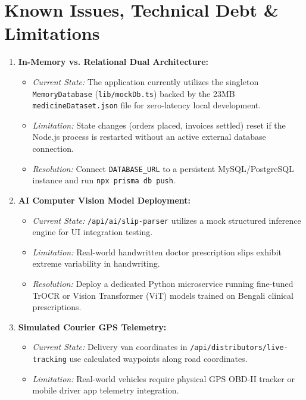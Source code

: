 \documentclass[10pt,a4paper]{article}
\begin{document}
\section{Known Issues, Technical Debt \& Limitations}
\begin{enumerate}[leftmargin=*]
    \item \textbf{In-Memory vs. Relational Dual Architecture:}
    \begin{itemize}
        \item \textit{Current State:} The application currently utilizes the singleton \texttt{MemoryDatabase} (\texttt{lib/mockDb.ts}) backed by the 23MB \texttt{medicineDataset.json} file for zero-latency local development.
        \item \textit{Limitation:} State changes (orders placed, invoices settled) reset if the Node.js process is restarted without an active external database connection.
        \item \textit{Resolution:} Connect \texttt{DATABASE\_URL} to a persistent MySQL/PostgreSQL instance and run \texttt{npx prisma db push}.
    \end{itemize}
    \item \textbf{AI Computer Vision Model Deployment:}
    \begin{itemize}
        \item \textit{Current State:} \texttt{/api/ai/slip-parser} utilizes a mock structured inference engine for UI integration testing.
        \item \textit{Limitation:} Real-world handwritten doctor prescription slips exhibit extreme variability in handwriting.
        \item \textit{Resolution:} Deploy a dedicated Python microservice running fine-tuned TrOCR or Vision Transformer (ViT) models trained on Bengali clinical prescriptions.
    \end{itemize}
    \item \textbf{Simulated Courier GPS Telemetry:}
    \begin{itemize}
        \item \textit{Current State:} Delivery van coordinates in \texttt{/api/distributors/live-tracking} use calculated waypoints along road coordinates.
        \item \textit{Limitation:} Real-world vehicles require physical GPS OBD-II tracker or mobile driver app telemetry integration.
    \end{itemize}
\end{enumerate}
\end{document}
